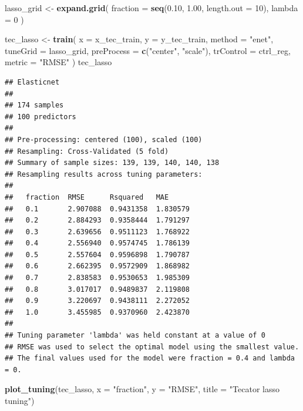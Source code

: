 \documentclass[
  11pt,
]{article}
\newenvironment{Shaded}{\begin{snugshade}}{\end{snugshade}}
\newcommand{\AttributeTok}[1]{\textcolor[rgb]{0.13,0.29,0.53}{#1}}
\newcommand{\DecValTok}[1]{\textcolor[rgb]{0.00,0.00,0.81}{#1}}
\newcommand{\FloatTok}[1]{\textcolor[rgb]{0.00,0.00,0.81}{#1}}
\newcommand{\FunctionTok}[1]{\textcolor[rgb]{0.13,0.29,0.53}{\textbf{#1}}}
\newcommand{\NormalTok}[1]{#1}
\newcommand{\OtherTok}[1]{\textcolor[rgb]{0.56,0.35,0.01}{#1}}
\newcommand{\StringTok}[1]{\textcolor[rgb]{0.31,0.60,0.02}{#1}}
\begin{document}
\begin{Shaded}
\begin{Highlighting}[]
\NormalTok{lasso\_grid }\OtherTok{\textless{}{-}} \FunctionTok{expand.grid}\NormalTok{(}
  \AttributeTok{fraction =} \FunctionTok{seq}\NormalTok{(}\FloatTok{0.10}\NormalTok{, }\FloatTok{1.00}\NormalTok{, }\AttributeTok{length.out =} \DecValTok{10}\NormalTok{),}
  \AttributeTok{lambda =} \DecValTok{0}
\NormalTok{)}

\NormalTok{tec\_lasso }\OtherTok{\textless{}{-}} \FunctionTok{train}\NormalTok{(}
  \AttributeTok{x =}\NormalTok{ x\_tec\_train,}
  \AttributeTok{y =}\NormalTok{ y\_tec\_train,}
  \AttributeTok{method =} \StringTok{"enet"}\NormalTok{,}
  \AttributeTok{tuneGrid =}\NormalTok{ lasso\_grid,}
  \AttributeTok{preProcess =} \FunctionTok{c}\NormalTok{(}\StringTok{"center"}\NormalTok{, }\StringTok{"scale"}\NormalTok{),}
  \AttributeTok{trControl =}\NormalTok{ ctrl\_reg,}
  \AttributeTok{metric =} \StringTok{"RMSE"}
\NormalTok{)}
\NormalTok{tec\_lasso}
\end{Highlighting}
\end{Shaded}

\begin{verbatim}
## Elasticnet 
## 
## 174 samples
## 100 predictors
## 
## Pre-processing: centered (100), scaled (100) 
## Resampling: Cross-Validated (5 fold) 
## Summary of sample sizes: 139, 139, 140, 140, 138 
## Resampling results across tuning parameters:
## 
##   fraction  RMSE      Rsquared   MAE     
##   0.1       2.907088  0.9431358  1.830579
##   0.2       2.884293  0.9358444  1.791297
##   0.3       2.639656  0.9511123  1.768922
##   0.4       2.556940  0.9574745  1.786139
##   0.5       2.557604  0.9596898  1.790787
##   0.6       2.662395  0.9572909  1.868982
##   0.7       2.838583  0.9530653  1.985309
##   0.8       3.017017  0.9489837  2.119808
##   0.9       3.220697  0.9438111  2.272052
##   1.0       3.455985  0.9370960  2.423870
## 
## Tuning parameter 'lambda' was held constant at a value of 0
## RMSE was used to select the optimal model using the smallest value.
## The final values used for the model were fraction = 0.4 and lambda = 0.
\end{verbatim}

\begin{Shaded}
\begin{Highlighting}[]
\FunctionTok{plot\_tuning}\NormalTok{(tec\_lasso, }\AttributeTok{x =} \StringTok{"fraction"}\NormalTok{, }\AttributeTok{y =} \StringTok{"RMSE"}\NormalTok{, }\AttributeTok{title =} \StringTok{"Tecator lasso tuning"}\NormalTok{)}
\end{Highlighting}
\end{Shaded}
\end{document}
